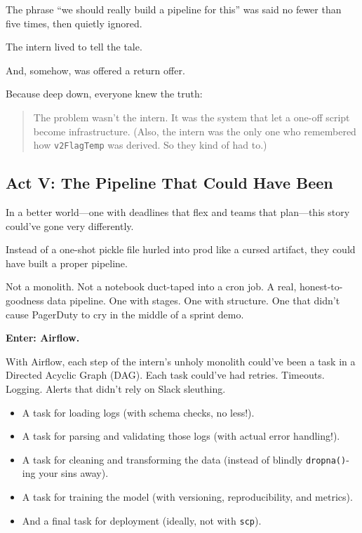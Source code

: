 The phrase “we should really build a pipeline for this” was said no fewer than five times, then quietly ignored.

The intern lived to tell the tale.

And, somehow, was offered a return offer.

Because deep down, everyone knew the truth:

\begin{quote}
The problem wasn’t the intern.  It was the system that let a one-off script become infrastructure.  (Also, the intern was the only one who remembered how \texttt{v2FlagTemp} was derived. So they kind of had to.)
\end{quote}

\subsection{Act V: The Pipeline That Could Have Been}

In a better world—one with deadlines that flex and teams that plan—this story could’ve gone very differently.

Instead of a one-shot pickle file hurled into prod like a cursed artifact, they could have built a proper pipeline.

Not a monolith. Not a notebook duct-taped into a cron job. A real, honest-to-goodness data pipeline. One with stages. One with structure. One that didn’t cause PagerDuty to cry in the middle of a sprint demo.

\textbf{Enter: Airflow.}

With Airflow, each step of the intern’s unholy monolith could’ve been a task in a Directed Acyclic Graph (DAG). Each task could’ve had retries. Timeouts. Logging. Alerts that didn’t rely on Slack sleuthing.

\begin{itemize}
  \item A task for loading logs (with schema checks, no less!).
  \item A task for parsing and validating those logs (with actual error handling!).
  \item A task for cleaning and transforming the data (instead of blindly \texttt{dropna()}-ing your sins away).
  \item A task for training the model (with versioning, reproducibility, and metrics).
  \item And a final task for deployment (ideally, not with \texttt{scp}).
\end{itemize}

